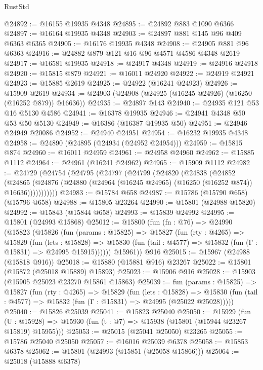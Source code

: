 \begin{lexlean}{RustStd}
\begin{coremodule}
@24892 := @16155 @19935 @4348
@24895 := @24892 @883 @1090 @6366
@24897 := @16164 @19935 @4348
@24903 := @24897 @881 @145 @96 @409 @6363 @6365
@24905 := @16176 @19935 @4348
@24908 := @24905 @881 @96 @6363
@24916 := @24882 @879 @121 @16 @96 @4571 @4586 @4348 @2619
@24917 := @16581 @19935
@24918 := @24917 @4348
@24919 := @24916 @24918
@24920 := @15815 @879
@24921 := @16011 @24920
@24922 := @24919 @24921
@24923 := @15885 @2619
@24925 := @24922 (@16241 @24923)
@24926 := @15909 @2619
@24934 := @24903 (@24908 (@24925 (@16245 @24926) (@16250 (@16252 @879)) @16636))
@24935 := @24897 @143
@24940 := @24935 @121 @53 @16 @5130 @4586
@24941 := @16378 @19935
@24946 := @24941 @4348 @50 @53 @50 @5130
@24949 := @16386 (@16387 @19935 @50)
@24951 := @24946 @24949 @20086
@24952 := @24940 @24951
@24954 := @16232 @19935 @4348
@24958 := @24890 (@24895 (@24934 (@24952 @24954)))
@24959 := @15815 @874
@24960 := @16011 @24959
@24961 := @24958 @24960
@24962 := @15885 @1112
@24964 := @24961 (@16241 @24962)
@24965 := @15909 @1112
@24982 := @24729
    (@24754
      (@24795
        (@24797
          (@24799
            (@24820
              (@24838
                (@24852
                  (@24865
                    (@24876 (@24880 (@24964 (@16245 @24965) (@16250 (@16252 @874)) @16636)))))))))))
@24983 := @15784 @658
@24987 := @15786 (@15790 @658) (@15796 @658)
@24988 := @15805 @23264
@24990 := @15801 (@24988 @15820)
@24992 := @15843 (@15844 @658)
@24993 := @15839 @24992
@24995 := @15801 (@24993 @15868)
@25012 := @15800
    (fun (fn : @76) =>
    @24990
      (@15823
        (@15826
          (fun (params : @15825) =>
          @15827
            (fun (rty : @4265) =>
            @15829
              (fun (lets : @15828) =>
              @15830 (fun (tail : @4577) => @15832 (fun (Γ : @15831) => @24995 @15915))))))
        @15961))
    @916
@25015 := @15967 (@24988 (@15818 @916))
@25018 := @15880 (@15881 @916) @23267
@25022 := @15801 (@15872 (@25018 @15889) @15893)
@25023 := @15906 @916
@25028 := @15903 (@15905 @25023 @23270 @15861 @15863)
@25039 := fun (params : @15825) =>
  @15827
    (fun (rty : @4265) =>
    @15829
      (fun (lets : @15828) =>
      @15830 (fun (tail : @4577) => @15832 (fun (Γ : @15831) => @24995 (@25022 @25028)))))
@25040 := @15826 @25039
@25041 := @15823 @25040
@25050 := @15929
    (fun (U : @15928) => @15930 (fun (t : @7) => @15938 (@15801 (@15944 @23267 @15819) @15955)))
@25053 := @25015 (@25041 @25050) @23265
@25055 := @15786 @25040 @25050
@25057 := @16016 @25039 @6378
@25058 := @15853 @6378
@25062 := @15801 (@24993 (@15851 (@25058 @15866)))
@25064 := @25018 (@15888 @6378)

\end{coremodule}
\end{lexlean}
